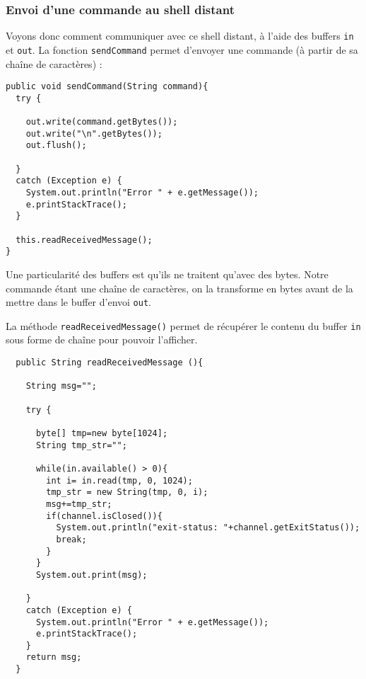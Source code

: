 \subsubsection{Envoi d'une commande au shell distant}
\label{sec:envoi-dune-commande}

\par Voyons donc comment communiquer avec ce shell distant, à l'aide des buffers \texttt{in} et \texttt{out}. La fonction \texttt{sendCommand} permet d'envoyer une commande (à partir de sa chaîne de caractères) :

\begin{verbatim}
public void sendCommand(String command){
  try {
    
    out.write(command.getBytes());
    out.write("\n".getBytes());
    out.flush();
    
  }
  catch (Exception e) {
    System.out.println("Error " + e.getMessage());
    e.printStackTrace();
  }
  
  this.readReceivedMessage();
}
\end{verbatim}

\par Une particularité des buffers est qu'ils ne traitent qu'avec des bytes. Notre commande étant une chaîne de caractères, on la transforme en bytes avant de la mettre dans le buffer d'envoi \texttt{out}.
\par La méthode \texttt{readReceivedMessage()} permet de récupérer le contenu du buffer \texttt{in} sous forme de chaîne pour pouvoir l'afficher.

\begin{verbatim}
  public String readReceivedMessage (){
    
    String msg="";
    
    try {
      
      byte[] tmp=new byte[1024];
      String tmp_str="";
      
      while(in.available() > 0){
        int i= in.read(tmp, 0, 1024);
        tmp_str = new String(tmp, 0, i);
        msg+=tmp_str;
        if(channel.isClosed()){
          System.out.println("exit-status: "+channel.getExitStatus());
          break;
        }
      }
      System.out.print(msg);
      
    }
    catch (Exception e) {
      System.out.println("Error " + e.getMessage());
      e.printStackTrace();
    }
    return msg;
  }
\end{verbatim}

